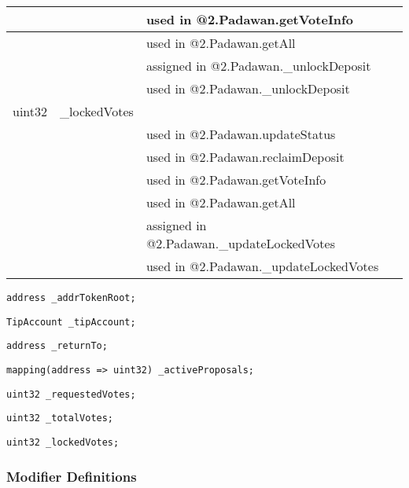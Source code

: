 \begin{tabular}{|l|l|p{5cm}|}
 & & used in @2.Padawan.getVoteInfo\\\hline
 & & used in @2.Padawan.getAll\\\hline
 & & assigned in @2.Padawan.\_{}unlockDeposit\\\hline
 & & used in @2.Padawan.\_{}unlockDeposit\\\hline
uint32 & \_{}lockedVotes &  \\\hline
 & & used in @2.Padawan.updateStatus\\\hline
 & & used in @2.Padawan.reclaimDeposit\\\hline
 & & used in @2.Padawan.getVoteInfo\\\hline
 & & used in @2.Padawan.getAll\\\hline
 & & assigned in @2.Padawan.\_{}updateLockedVotes\\\hline
 & & used in @2.Padawan.\_{}updateLockedVotes\\\hline
\end{tabular}
\fi


\begin{lstlisting}[firstnumber=21]
    address _addrTokenRoot;
\end{lstlisting}

\begin{lstlisting}[firstnumber=23]
    TipAccount _tipAccount;
\end{lstlisting}

\begin{lstlisting}[firstnumber=24]
    address _returnTo;
\end{lstlisting}

\begin{lstlisting}[firstnumber=26]
    mapping(address => uint32) _activeProposals;
\end{lstlisting}

\begin{lstlisting}[firstnumber=28]
    uint32 _requestedVotes;
\end{lstlisting}

\begin{lstlisting}[firstnumber=29]
    uint32 _totalVotes;
\end{lstlisting}

\begin{lstlisting}[firstnumber=30]
    uint32 _lockedVotes;
\end{lstlisting}

\subsubsection{Modifier Definitions}



